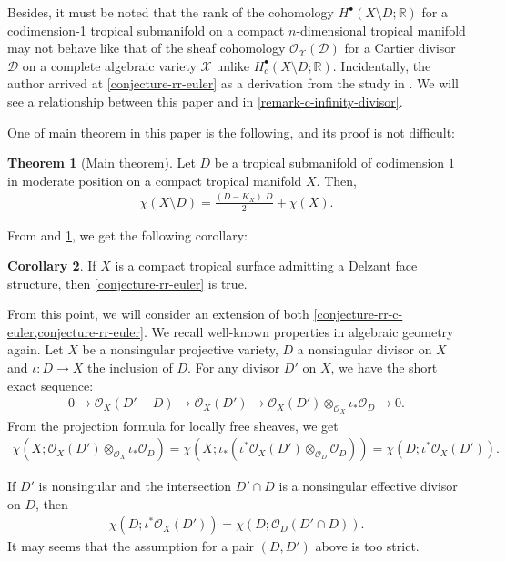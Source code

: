 \documentclass[a4paper,dvipdfmx,reqno,12pt]{amsart}
\theoremstyle{definition}
\newtheorem{theorem}{Theorem}[section]
\newtheorem{corollary}[theorem]{Corollary}
\numberwithin{equation}{section}
\begin{document}
Besides, it must be noted that
the rank of the cohomology 
$H^{\bullet}(X\setminus D;\mathbb{R})$ 
for a codimension-1 tropical submanifold
on a compact $n$-dimensional tropical manifold
may not behave like that of
the sheaf cohomology 
$\mathcal{O}_{\mathcal{X}}(\mathcal{D})$
for a Cartier divisor $\mathcal{D}$ 
on a complete algebraic variety
$\mathcal{X}$ unlike
$H^{\bullet}_c(X\setminus D;\mathbb{R})$.
Incidentally, the author arrived at
\cref{conjecture-rr-euler} as
a derivation from the study in
\cite{tsutsui2023graded}. 
We will see a relationship between 
this paper and \cite{tsutsui2023graded}
in \cref{remark-c-infinity-divisor}.

One of main theorem in this paper
is the following, and its proof is not difficult:
\begin{theorem}[{Main theorem}]
\label{theorem-rr-euler-surface}
Let $D$ be a tropical submanifold of codimension $1$
in moderate position on a compact tropical manifold
$X$. Then,
\begin{align}
\chi(X\setminus D)=\frac{(D-K_X). D}{2}+
\chi(X).
\end{align}
\end{theorem}
From \cite[Theorem 6.3]{demedrano2023chern}
and \cref{theorem-rr-euler-surface}, we get
the following corollary:
\begin{corollary}
\label{corollary-ds-euler-rr}
If $X$ is a compact tropical surface admitting 
a Delzant face structure, then
\cref{conjecture-rr-euler} is true.
\end{corollary}
From this point, 
we will consider an extension of both
\cref{conjecture-rr-c-euler,conjecture-rr-euler}.
We recall well-known properties in algebraic geometry again.
Let $X$ be a nonsingular projective variety,
$D$ a nonsingular divisor on $X$ and
$\iota\colon D\to X$ the inclusion of $D$.
For any divisor $D'$ on $X$, we have
the short exact sequence:
\begin{align}
0 \to \mathcal{O}_X(D'-D)\to \mathcal{O}_X(D')
\to \mathcal{O}_X(D')
\otimes_{\mathcal{O}_X} \iota_*\mathcal{O}_D \to 0. 
\end{align}
From the projection formula for locally free sheaves,
we get 
\begin{align}
\chi(X;\mathcal{O}_X(D')\otimes_{\mathcal{O}_X} \iota_*\mathcal{O}_D)
=\chi(X;\iota_*(\iota^{*}\mathcal{O}_X(D')\otimes_{\mathcal{O}_D} \mathcal{O}_D))
=\chi(D;\iota^{*}\mathcal{O}_X(D')).
\end{align}

If $D'$ is nonsingular and the intersection
$D'\cap D$ is a nonsingular effective divisor
on $D$, then
\begin{align}
\chi(D;\iota^{*}\mathcal{O}_X(D'))=\chi(D;\mathcal{O}_D(D'\cap D)).
\end{align}
It may seems that 
the assumption for a pair $(D,D')$ above is
too strict.
\end{document}
